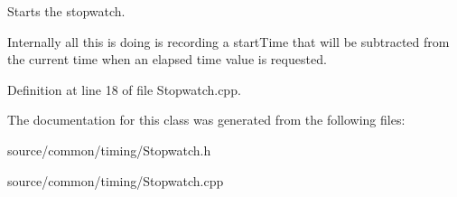 Starts the stopwatch. 

Internally all this is doing is recording a start\-Time that will be subtracted from the current time when an elapsed time value is requested. 

Definition at line 18 of file Stopwatch.\-cpp.



The documentation for this class was generated from the following files\-:\begin{DoxyCompactItemize}
\item 
source/common/timing/Stopwatch.\-h\item 
source/common/timing/Stopwatch.\-cpp\end{DoxyCompactItemize}
